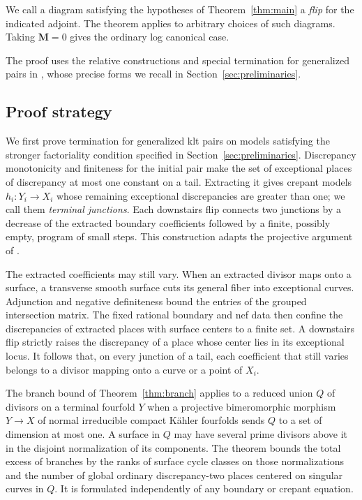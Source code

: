 \documentclass[11pt]{amsart}
\theoremstyle{definition}
\theoremstyle{remark}
\numberwithin{equation}{section}
\newcommand{\M}{\mathbf{M}}
\begin{document}
We call a diagram satisfying the hypotheses of Theorem~\ref{thm:main} a \emph{flip} for the indicated adjoint. The theorem applies to arbitrary choices of such diagrams. Taking \(\M=0\) gives the ordinary log canonical case.

The proof uses the relative constructions and special termination for generalized pairs in \cite{KahlerAuxiliary}, whose precise forms we recall in Section~\ref{sec:preliminaries}.

\subsection*{Proof strategy}

We first prove termination for generalized klt pairs on models satisfying the stronger factoriality condition specified in Section~\ref{sec:preliminaries}. Discrepancy monotonicity and finiteness for the initial pair make the set of exceptional places of discrepancy at most one constant on a tail. Extracting it gives crepant models \(h_i:Y_i\to X_i\) whose remaining exceptional discrepancies are greater than one; we call them \emph{terminal junctions}. Each downstairs flip connects two junctions by a decrease of the extracted boundary coefficients followed by a finite, possibly empty, program of small steps. This construction adapts the projective argument of \cite[Section~3, Proposition~3.4]{ProjectiveLCFourfolds}.

The extracted coefficients may still vary. When an extracted divisor maps onto a surface, a transverse smooth surface cuts its general fiber into exceptional curves. Adjunction and negative definiteness bound the entries of the grouped intersection matrix. The fixed rational boundary and nef data then confine the discrepancies of extracted places with surface centers to a finite set. A downstairs flip strictly raises the discrepancy of a place whose center lies in its exceptional locus. It follows that, on every junction of a tail, each coefficient that still varies belongs to a divisor mapping onto a curve or a point of \(X_i\).

The branch bound of Theorem~\ref{thm:branch} applies to a reduced union \(Q\) of divisors on a terminal fourfold \(Y\) when a projective bimeromorphic morphism \(Y\to X\) of normal irreducible compact K\"ahler fourfolds sends \(Q\) to a set of dimension at most one. A surface in \(Q\) may have several prime divisors above it in the disjoint normalization of its components. The theorem bounds the total excess of branches by the ranks of surface cycle classes on those normalizations and the number of global ordinary discrepancy-two places centered on singular curves in \(Q\). It is formulated independently of any boundary or crepant equation.
\end{document}
